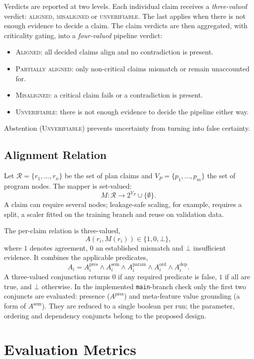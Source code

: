 Verdicts are reported at two levels. Each individual claim receives a
\emph{three-valued} verdict: \textsc{aligned}, \textsc{misaligned}
or \textsc{unverifiable}. The last applies when there is not enough
evidence to decide a claim. The claim verdicts are then aggregated, with
criticality gating, into a \emph{four-valued} pipeline verdict:
\begin{itemize}
    \item \textsc{Aligned}: all decided claims align and no
    contradiction is present.
    \item \textsc{Partially aligned}: only non-critical claims
    mismatch or remain unaccounted for.
    \item \textsc{Misaligned}: a critical claim fails or a
    contradiction is present.
    \item \textsc{Unverifiable}: there is not enough evidence to
    decide the pipeline either way.
\end{itemize}
Abstention (\textsc{Unverifiable}) prevents uncertainty from turning
into false certainty.

\subsection{Alignment Relation}

Let $\mathcal{R} = \{r_1, \dots, r_n\}$ be the set of plan claims and
$V_P = \{p_1, \dots, p_m\}$ the set of program nodes. The mapper is
set-valued:
\[
M : \mathcal{R} \to 2^{V_P} \cup \{\emptyset\}.
\]
A claim can require several nodes; leakage-safe scaling, for
example, requires a split, a scaler fitted on the training branch and
reuse on validation data.

The per-claim relation is three-valued,
\[
A(r_i, M(r_i)) \in \{1, 0, \bot\},
\]
where $1$ denotes agreement, $0$ an established mismatch and $\bot$
insufficient evidence. It combines the applicable predicates,
\[
A_i = A_i^{\mathrm{pres}} \wedge A_i^{\mathrm{sem}} \wedge
A_i^{\mathrm{param}} \wedge A_i^{\mathrm{ord}} \wedge
A_i^{\mathrm{dep}} .
\]
A three-valued conjunction returns $0$ if any required predicate is
false, $1$ if all are true, and $\bot$ otherwise. In the implemented
\texttt{main}-branch check only the first two conjuncts are evaluated:
presence ($A^{\mathrm{pres}}$) and meta-feature value grounding
(a form of $A^{\mathrm{sem}}$). They are reduced to a single
boolean per run; the parameter, ordering and dependency conjuncts
belong to the proposed design.

\section{Evaluation Metrics}

